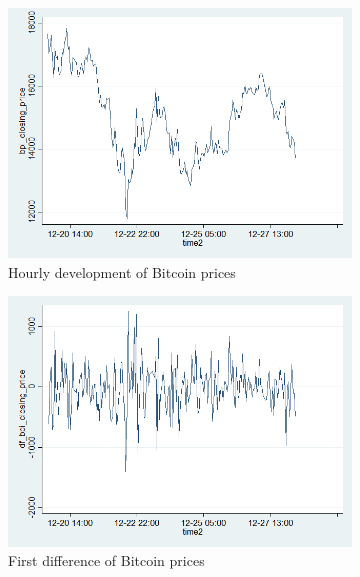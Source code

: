 \documentclass[a4paper,american,12pt]{article}
\begin{document}
\begin{spacing}{1.2}
\begin{figure}[H]
	\begin{subfigure}{.3\textwidth}
	\centering
	\includegraphics[width=1.12\textwidth]{stata_export_graphs/graph_plot_bpi.png}
	\caption{Hourly development of Bitcoin prices}
	\end{subfigure}\hfill
	\begin{subfigure}{.3\textwidth}
	\centering
	\includegraphics[width=1.12\textwidth]{stata_export_graphs/graph_plot_df_bpi.png}
	\caption{First difference of Bitcoin prices}
	\end{subfigure}\hfill
	\begin{subfigure}{.3\textwidth}
	\centering

\end{subfigure}
\end{figure}
\end{spacing}
\end{document}

